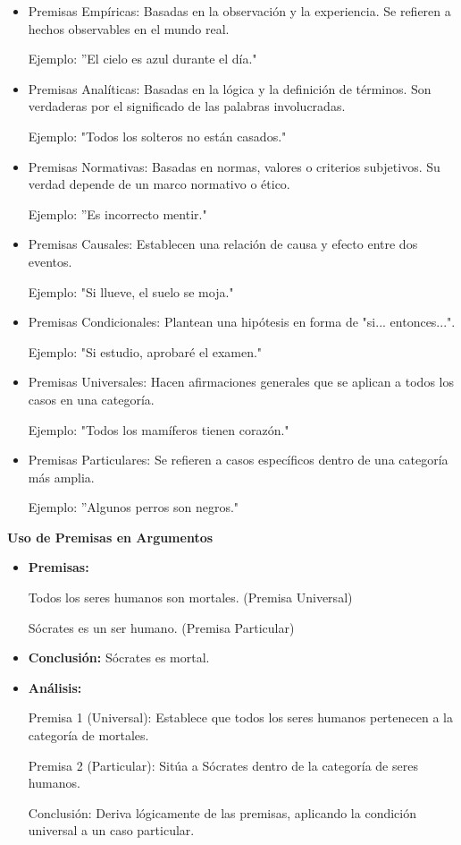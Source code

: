 \begin{itemize}
   \item Premisas Empíricas:
         Basadas en la observación y la experiencia. Se refieren a hechos observables en el mundo real.
         
         Ejemplo: ''El cielo es azul durante el día."
   \item Premisas Analíticas:
         Basadas en la lógica y la definición de términos. Son verdaderas por el significado de las palabras involucradas.
         
         Ejemplo: "Todos los solteros no están casados."
   \item Premisas Normativas:
         Basadas en normas, valores o criterios subjetivos. Su verdad depende de un marco normativo o ético.
         
         Ejemplo: ''Es incorrecto mentir."
   \item Premisas Causales:
         Establecen una relación de causa y efecto entre dos eventos.
         
         Ejemplo: "Si llueve, el suelo se moja."
   \item Premisas Condicionales:
         Plantean una hipótesis en forma de "si... entonces...".
         
         Ejemplo: "Si estudio, aprobaré el examen."
   \item Premisas Universales:
         Hacen afirmaciones generales que se aplican a todos los casos en una categoría.
         
         Ejemplo: "Todos los mamíferos tienen corazón."
   \item Premisas Particulares:
         Se refieren a casos específicos dentro de una categoría más amplia.
         
         Ejemplo: ''Algunos perros son negros."
\end{itemize}

\textbf{Uso de Premisas en Argumentos}

\begin{itemize}
   \item \textbf{Premisas:}
         
         Todos los seres humanos son mortales. (Premisa Universal)
         
         Sócrates es un ser humano. (Premisa Particular)
         
   \item \textbf{Conclusión:}
         Sócrates es mortal.
         
   \item \textbf{Análisis:}
         
         Premisa 1 (Universal): Establece que todos los seres humanos pertenecen a la categoría de mortales.
         
         Premisa 2 (Particular): Sitúa a Sócrates dentro de la categoría de seres humanos.
         
         Conclusión: Deriva lógicamente de las premisas, aplicando la condición universal a un caso particular.
         
\end{itemize}

